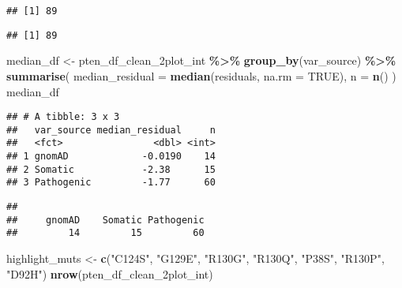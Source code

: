 \documentclass[
]{article}
\newenvironment{Shaded}{\begin{snugshade}}{\end{snugshade}}
\newcommand{\AttributeTok}[1]{\textcolor[rgb]{0.13,0.29,0.53}{#1}}
\newcommand{\CommentTok}[1]{\textcolor[rgb]{0.56,0.35,0.01}{\textit{#1}}}
\newcommand{\ConstantTok}[1]{\textcolor[rgb]{0.56,0.35,0.01}{#1}}
\newcommand{\FunctionTok}[1]{\textcolor[rgb]{0.13,0.29,0.53}{\textbf{#1}}}
\newcommand{\NormalTok}[1]{#1}
\newcommand{\OtherTok}[1]{\textcolor[rgb]{0.56,0.35,0.01}{#1}}
\newcommand{\SpecialCharTok}[1]{\textcolor[rgb]{0.81,0.36,0.00}{\textbf{#1}}}
\newcommand{\StringTok}[1]{\textcolor[rgb]{0.31,0.60,0.02}{#1}}
\begin{document}
\begin{verbatim}
## [1] 89
\end{verbatim}

\begin{Shaded}
\end{Shaded}

\begin{verbatim}
## [1] 89
\end{verbatim}

\begin{Shaded}
\begin{Highlighting}[]
\NormalTok{median\_df }\OtherTok{\textless{}{-}}\NormalTok{ pten\_df\_clean\_2plot\_int }\SpecialCharTok{\%\textgreater{}\%}
  \FunctionTok{group\_by}\NormalTok{(var\_source) }\SpecialCharTok{\%\textgreater{}\%}
  \FunctionTok{summarise}\NormalTok{(}
    \AttributeTok{median\_residual =} \FunctionTok{median}\NormalTok{(residuals, }\AttributeTok{na.rm =} \ConstantTok{TRUE}\NormalTok{),}
    \AttributeTok{n =} \FunctionTok{n}\NormalTok{()}
\NormalTok{  )}
\NormalTok{median\_df}
\end{Highlighting}
\end{Shaded}

\begin{verbatim}
## # A tibble: 3 x 3
##   var_source median_residual     n
##   <fct>                <dbl> <int>
## 1 gnomAD             -0.0190    14
## 2 Somatic            -2.38      15
## 3 Pathogenic         -1.77      60
\end{verbatim}

\begin{Shaded}
\end{Shaded}

\begin{verbatim}
## 
##     gnomAD    Somatic Pathogenic 
##         14         15         60
\end{verbatim}

\begin{Shaded}
\begin{Highlighting}[]
\NormalTok{highlight\_muts }\OtherTok{\textless{}{-}} \FunctionTok{c}\NormalTok{(}\StringTok{"C124S"}\NormalTok{, }\StringTok{"G129E"}\NormalTok{, }\StringTok{"R130G"}\NormalTok{, }\StringTok{"R130Q"}\NormalTok{, }\StringTok{"P38S"}\NormalTok{, }\StringTok{"R130P"}\NormalTok{, }\StringTok{"D92H"}\NormalTok{)}
\FunctionTok{nrow}\NormalTok{(pten\_df\_clean\_2plot\_int)}
\end{Highlighting}
\end{Shaded}
\end{document}
